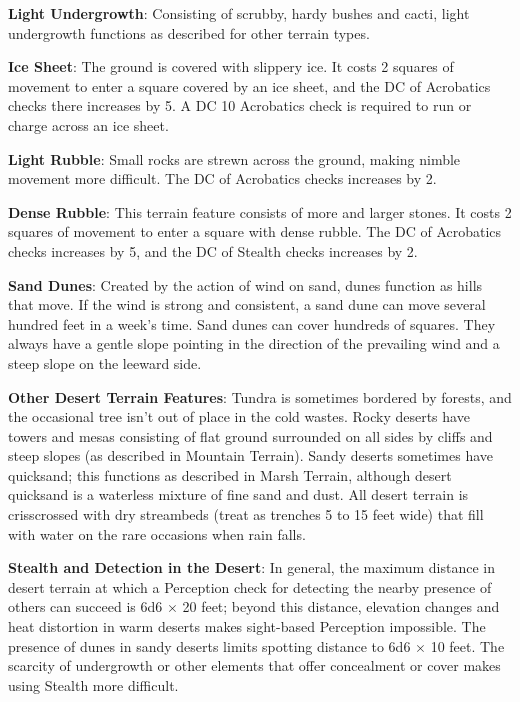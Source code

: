				
\textbf{Light Undergrowth}: Consisting of scrubby, hardy bushes and cacti, light undergrowth functions as described for other terrain types.
				
\textbf{Ice Sheet}: The ground is covered with slippery ice. It costs 2 squares of movement to enter a square covered by an ice sheet, and the DC of Acrobatics checks there increases by 5. A DC 10 Acrobatics check is required to run or charge across an ice sheet. 
				
\textbf{Light Rubble}: Small rocks are strewn across the ground, making nimble movement more difficult. The DC of Acrobatics checks increases by 2. 
				
\textbf{Dense Rubble}: This terrain feature consists of more and larger stones. It costs 2 squares of movement to enter a square with dense rubble. The DC of Acrobatics checks increases by 5, and the DC of Stealth checks increases by 2.
				
\textbf{Sand Dunes}: Created by the action of wind on sand, dunes function as hills that move. If the wind is strong and consistent, a sand dune can move several hundred feet in a week's time. Sand dunes can cover hundreds of squares. They always have a gentle slope pointing in the direction of the prevailing wind and a steep slope on the leeward side.
				
\textbf{Other Desert Terrain Features}: Tundra is sometimes bordered by forests, and the occasional tree isn't out of place in the cold wastes. Rocky deserts have towers and mesas consisting of flat ground surrounded on all sides by cliffs and steep slopes (as described in Mountain Terrain). Sandy deserts sometimes have quicksand; this functions as described in Marsh Terrain, although desert quicksand is a waterless mixture of fine sand and dust. All desert terrain is crisscrossed with dry streambeds (treat as trenches 5 to 15 feet wide) that fill with water on the rare occasions when rain falls.
				
\textbf{Stealth and Detection in the Desert}: In general, the maximum distance in desert terrain at which a Perception check for detecting the nearby presence of others can succeed is 6d6 \mbox{$\times$} 20 feet; beyond this distance, elevation changes and heat distortion in warm deserts makes sight-based Perception impossible. The presence of dunes in sandy deserts limits spotting distance to 6d6 \mbox{$\times$} 10 feet. The scarcity of undergrowth or other elements that offer concealment or cover makes using Stealth more difficult.
				
